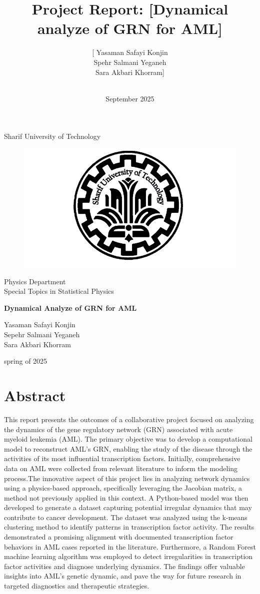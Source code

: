 \documentclass[a4paper,12pt]{article}
\title{Project Report: [Dynamical analyze of GRN for AML]}
\author{[ Yasaman Safayi Konjin \\ Spehr Salmani Yeganeh \\ Sara Akbari Khorram] \\ [physics , sharif university of technology] \\ [Your Email(s)]}
\date{September 2025}
\begin{document}
\begin{titlepage}
	\centering
	{\large Sharif University of Technology\par}
	\begin{figure}
		\centering
		\includegraphics[width=0.5\linewidth]{csm_kisspng-sharif-university-of-technology-university-of-teheran_7c97300984.png}
		\label{fig:placeholder}
	\end{figure}
	{\large Physics Department \\ Special Topics in Statistical Physics \par}
	\vspace{1 cm}
	{\Huge \bfseries Dynamical Analyze of GRN for AML \par}
	\vspace{1cm}
	{\Large Yasaman Safayi Konjin \\ Sepehr Salmani Yeganeh \\ Sara Akbari Khorram \par}
	\vspace{1 cm}
	
	{\large spring of 2025 \par}
\end{titlepage}

\clearpage
\section*{Abstract}


This report presents the outcomes of a collaborative project focused on analyzing the dynamics of the gene regulatory network (GRN) associated with acute myeloid leukemia (AML). The primary objective was to develop a computational model to reconstruct AML’s GRN, enabling the study of the disease through the activities of its most influential transcription factors. Initially, comprehensive data on AML were collected from relevant literature to inform the modeling process.The innovative aspect of this project lies in analyzing network dynamics using a physics-based approach, specifically leveraging the Jacobian matrix, a method not previously applied in this context. A Python-based model was then developed to generate a dataset capturing potential irregular dynamics that may contribute to cancer development. The dataset was analyzed using the k-means clustering method to identify patterns in transcription factor activity. The results demonstrated a promising alignment with documented transcription factor behaviors in AML cases reported in the literature. Furthermore, a Random Forest machine learning algorithm was employed to detect irregularities in transcription factor activities and diagnose underlying dynamics. The findings offer valuable insights into AML’s genetic dynamic, and pave the way for future research in targeted diagnostics and therapeutic strategies.
\end{document}
